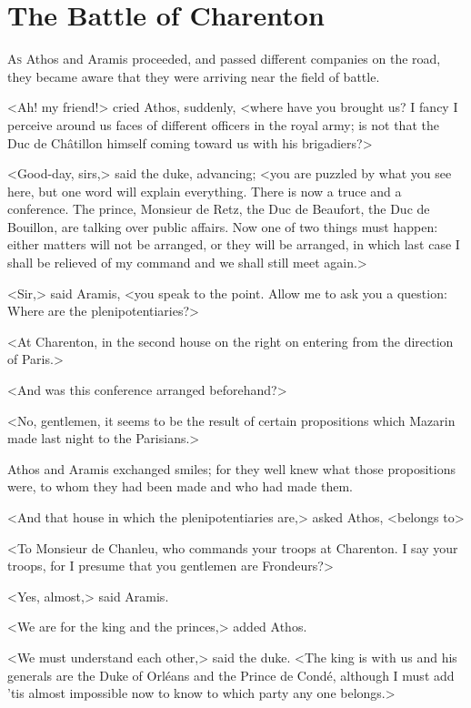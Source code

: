 \chapter{The Battle of Charenton}

 \lettrine{A}{s} Athos and Aramis proceeded, and passed different companies on the road, they became aware that they were arriving near the field of battle.

\zz
<Ah! my friend!> cried Athos, suddenly, <where have you brought us? I fancy I perceive around us faces of different officers in the royal army; is not that the Duc de Châtillon himself coming toward us with his brigadiers?>

<Good-day, sirs,> said the duke, advancing; <you are puzzled by what you see here, but one word will explain everything. There is now a truce and a conference. The prince, Monsieur de Retz, the Duc de Beaufort, the Duc de Bouillon, are talking over public affairs. Now one of two things must happen: either matters will not be arranged, or they will be arranged, in which last case I shall be relieved of my command and we shall still meet again.>

<Sir,> said Aramis, <you speak to the point. Allow me to ask you a question: Where are the plenipotentiaries?>

<At Charenton, in the second house on the right on entering from the direction of Paris.>

<And was this conference arranged beforehand?>

<No, gentlemen, it seems to be the result of certain propositions which Mazarin made last night to the Parisians.>

Athos and Aramis exchanged smiles; for they well knew what those propositions were, to whom they had been made and who had made them.

<And that house in which the plenipotentiaries are,> asked Athos, <belongs to\longdash>

<To Monsieur de Chanleu, who commands your troops at Charenton. I say your troops, for I presume that you gentlemen are Frondeurs?>

<Yes, almost,> said Aramis.

<We are for the king and the princes,> added Athos.

<We must understand each other,> said the duke. <The king is with us and his generals are the Duke of Orléans and the Prince de Condé, although I must add 'tis almost impossible now to know to which party any one belongs.>

